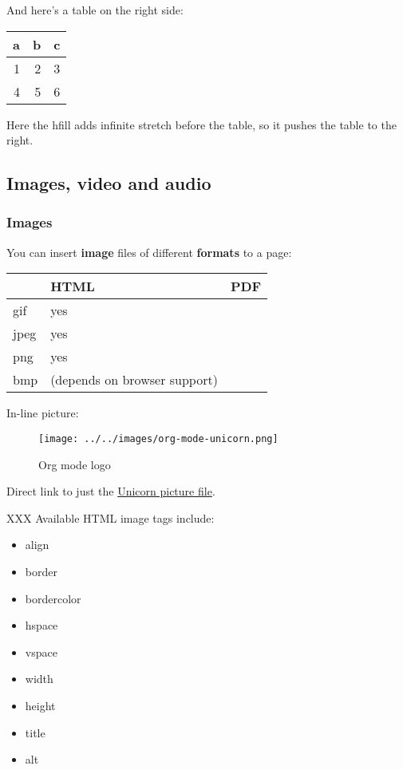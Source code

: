 \documentclass[11pt]{article}
\begin{document}
And here's a table on the right side:

\hfill
\begin{tabular}{rrr}
a & b & c\\[0pt]
\hline
1 & 2 & 3\\[0pt]
4 & 5 & 6\\[0pt]
\end{tabular}

Here the hfill adds infinite stretch before the table, so it pushes the table
to the right.

\subsection*{Images, video and audio}
\label{sec:org57ef8ef}

\subsubsection*{Images}
\label{sec:orgeef4943}

You can insert \textbf{image} files of different \textbf{formats} to a page:

\begin{center}
\begin{tabular}{lll}
 & HTML & PDF\\[0pt]
\hline
gif & yes & \\[0pt]
jpeg & yes & \\[0pt]
png & yes & \\[0pt]
bmp & (depends on browser support) & \\[0pt]
\end{tabular}
\end{center}

In-line picture:

\begin{figure}[htbp]
\centering
\texttt{[image: ../../images/org-mode-unicorn.png]}
\caption{Org mode logo}
\end{figure}

Direct link to just the \href{org-mode-unicorn.png}{Unicorn picture file}.

XXX Available HTML image tags include:

\begin{itemize}
\item align
\item border
\item bordercolor
\item hspace
\item vspace
\item width
\item height
\item title
\item alt
\end{itemize}
\end{document}
